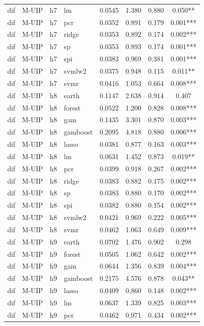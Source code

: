 \begin{ThreePartTable}
\begin{longtable}[t]{llclcccc}
dif & M-UIP & h7 & lm & 0.0545 & 1.380 & 0.880 & 0.050**\\
dif & M-UIP & h7 & pcr & 0.0352 & 0.891 & 0.179 & 0.001***\\
dif & M-UIP & h7 & ridge & 0.0353 & 0.892 & 0.174 & 0.002***\\
dif & M-UIP & h7 & sp & 0.0353 & 0.893 & 0.174 & 0.001***\\
dif & M-UIP & h7 & spi & 0.0383 & 0.969 & 0.381 & 0.001***\\
dif & M-UIP & h7 & svmlw2 & 0.0375 & 0.948 & 0.115 & 0.011**\\
dif & M-UIP & h7 & svmr & 0.0416 & 1.053 & 0.664 & 0.008***\\
\addlinespace
dif & M-UIP & h8 & earth & 0.1147 & 2.638 & 0.914 & 0.407\\
dif & M-UIP & h8 & forest & 0.0522 & 1.200 & 0.828 & 0.008***\\
dif & M-UIP & h8 & gam & 0.1435 & 3.301 & 0.870 & 0.003***\\
dif & M-UIP & h8 & gamboost & 0.2095 & 4.818 & 0.880 & 0.006***\\
dif & M-UIP & h8 & lasso & 0.0381 & 0.877 & 0.163 & 0.003***\\
dif & M-UIP & h8 & lm & 0.0631 & 1.452 & 0.873 & 0.019**\\
dif & M-UIP & h8 & pcr & 0.0399 & 0.918 & 0.267 & 0.002***\\
dif & M-UIP & h8 & ridge & 0.0383 & 0.882 & 0.175 & 0.002***\\
dif & M-UIP & h8 & sp & 0.0383 & 0.880 & 0.170 & 0.002***\\
dif & M-UIP & h8 & spi & 0.0382 & 0.880 & 0.154 & 0.002***\\
dif & M-UIP & h8 & svmlw2 & 0.0421 & 0.969 & 0.222 & 0.005***\\
dif & M-UIP & h8 & svmr & 0.0462 & 1.063 & 0.649 & 0.009***\\
\addlinespace
dif & M-UIP & h9 & earth & 0.0702 & 1.476 & 0.902 & 0.298\\
dif & M-UIP & h9 & forest & 0.0505 & 1.062 & 0.642 & 0.002***\\
dif & M-UIP & h9 & gam & 0.0644 & 1.356 & 0.839 & 0.004***\\
dif & M-UIP & h9 & gamboost & 0.2175 & 4.576 & 0.878 & 0.043**\\
dif & M-UIP & h9 & lasso & 0.0409 & 0.860 & 0.148 & 0.002***\\
dif & M-UIP & h9 & lm & 0.0637 & 1.339 & 0.825 & 0.003***\\
dif & M-UIP & h9 & pcr & 0.0462 & 0.971 & 0.434 & 0.002***\\

\end{longtable}
\end{ThreePartTable}
